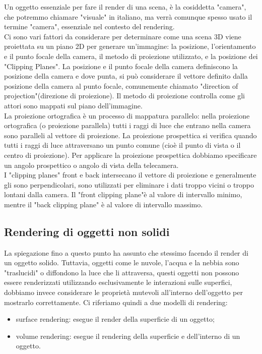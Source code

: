 Un oggetto essenziale per fare il render di una scena, è la cosiddetta "camera", che potremmo chiamare "visuale" in italiano, ma verrà comunque spesso usato il termine "camera", essenziale nel contesto del rendering.\\
Ci sono vari fattori da considerare per determinare come una scena 3D viene proiettata su un piano 2D per generare un'immagine: la posizione, l'orientamento e il punto focale della camera, il metodo di proiezione utilizzato, e la posizione dei "Clipping Planes". La posizione e il punto focale della camera definiscono la posizione della camera e dove punta, si può considerare il vettore definito dalla posizione della camera al punto focale, comunemente chiamato "direction of projection"(direzione di proiezione). Il metodo di proiezione controlla come gli attori sono mappati sul piano dell'immagine.
\\
La proiezione ortografica è un processo di mappatura parallelo: nella proiezione ortografica (o proiezione parallela) tutti i raggi di luce che entrano nella camera sono paralleli al vettore di proiezione. La proiezione prospettica si verifica quando tutti i raggi di luce attraversano un punto comune (cioè il punto di vista o il centro di proiezione). Per applicare la proiezione prospettica dobbiamo specificare un angolo prospettico o angolo di vista della telecamera.
\\
I "clipping planes" front e back intersecano il vettore di proiezione e generalmente gli sono perpendicolari, sono utilizzati per eliminare i dati troppo vicini o troppo lontani dalla camera. Il "front clipping plane"è al valore di intervallo minimo, mentre il "back clipping plane" è al valore di intervallo massimo.

\subsection{Rendering di oggetti non solidi}
La spiegazione fino a questo punto ha assunto che stessimo facendo il render di un oggetto solido. Tuttavia, oggetti come le nuvole, l'acqua e la nebbia sono "traslucidi" o diffondono la luce che li attraversa, questi oggetti non possono essere renderizzati utilizzando esclusivamente le interazioni sulle superfici, dobbiamo invece considerare le proprietà mutevoli all'interno dell'oggetto per mostrarlo correttamente. Ci riferiamo quindi a due modelli di rendering:
\begin{itemize}
\item surface rendering: esegue il render della superficie di un oggetto;
\item volume rendering: esegue il rendering della superficie e dell'interno di un oggetto.
\end{itemize}

